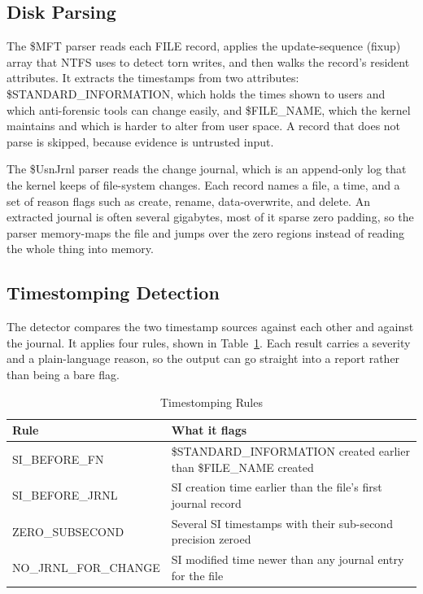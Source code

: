 \documentclass[12pt,onecolumn]{IEEEtran}
\begin{document}
\subsection{Disk Parsing}
The \$MFT parser reads each FILE record, applies the update-sequence (fixup) array that NTFS uses to detect torn writes, and then walks the record's resident attributes. It extracts the timestamps from two attributes: \$STANDARD\_INFORMATION, which holds the times shown to users and which anti-forensic tools can change easily, and \$FILE\_NAME, which the kernel maintains and which is harder to alter from user space. A record that does not parse is skipped, because evidence is untrusted input.

The \$UsnJrnl parser reads the change journal, which is an append-only log that the kernel keeps of file-system changes. Each record names a file, a time, and a set of reason flags such as create, rename, data-overwrite, and delete. An extracted journal is often several gigabytes, most of it sparse zero padding, so the parser memory-maps the file and jumps over the zero regions instead of reading the whole thing into memory.

\subsection{Timestomping Detection}
The detector compares the two timestamp sources against each other and against the journal. It applies four rules, shown in Table~\ref{tab:rules}. Each result carries a severity and a plain-language reason, so the output can go straight into a report rather than being a bare flag.

\begin{table}[htbp]
\centering
\caption{Timestomping Rules}
\label{tab:rules}
\begin{tabular}{p{} p{}}
\toprule
\textbf{Rule} & \textbf{What it flags} \\
\midrule
SI\_BEFORE\_FN       & \$STANDARD\_INFORMATION created earlier than \$FILE\_NAME created \\
SI\_BEFORE\_JRNL     & SI creation time earlier than the file's first journal record \\
ZERO\_SUBSECOND      & Several SI timestamps with their sub-second precision zeroed \\
NO\_JRNL\_FOR\_CHANGE & SI modified time newer than any journal entry for the file \\
\bottomrule
\end{tabular}
\end{table}
\end{document}
